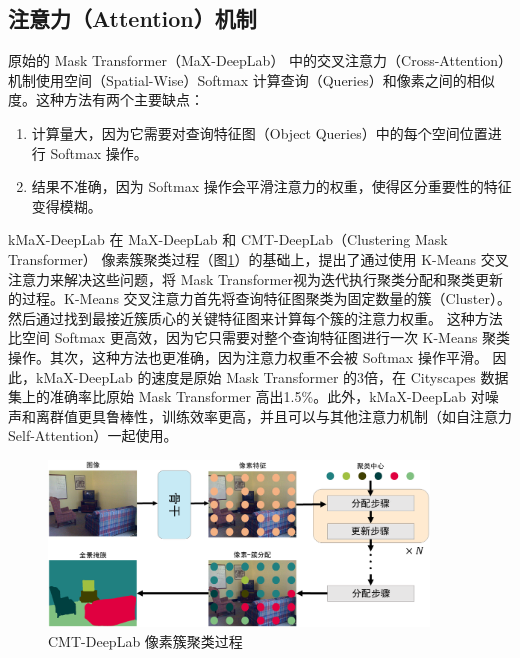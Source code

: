 \subsection{注意力（Attention）机制}

\par 原始的 Mask Transformer（MaX-DeepLab）\cite{mask_transformer} 中的交叉注意力（Cross-Attention）机制使用空间（Spatial-Wise）Softmax 计算查询（Queries）和像素之间的相似度。这种方法有两个主要缺点：

\begin{enumerate}
	\item 计算量大，因为它需要对查询特征图（Object Queries）中的每个空间位置进行 Softmax 操作。
	\item 结果不准确，因为 Softmax 操作会平滑注意力的权重，使得区分重要性的特征变得模糊。
\end{enumerate}

\par kMaX-DeepLab 在 MaX-DeepLab\cite{mask_transformer} 和 CMT-DeepLab（Clustering Mask Transformer）\cite{cluster_mask_transformer} 像素簇聚类过程（图\ref{fig:cluster_mask_transformer}）的基础上，提出了通过使用 K-Means 交叉注意力来解决这些问题，将 Mask Transformer\cite{mask_transformer}视为迭代执行聚类分配和聚类更新的过程。K-Means 交叉注意力首先将查询特征图聚类为固定数量的簇（Cluster）。然后通过找到最接近簇质心的关键特征图来计算每个簇的注意力权重。
这种方法比空间 Softmax 更高效，因为它只需要对整个查询特征图进行一次 K-Means 聚类操作。其次，这种方法也更准确，因为注意力权重不会被 Softmax 操作平滑。
因此，kMaX-DeepLab 的速度是原始 Mask Transformer 的3倍，在 Cityscapes 数据集上的准确率比原始 Mask Transformer 高出1.5\%。此外，kMaX-DeepLab 对噪声和离群值更具鲁棒性，训练效率更高，并且可以与其他注意力机制（如自注意力 Self-Attention）一起使用。

\begin{figure}[htb]
	\centering
	\includegraphics[width=0.9\textwidth]{figures/clustering_view_of_mask_transformer.png}
	\caption{CMT-DeepLab 像素簇聚类过程}
	\label{fig:cluster_mask_transformer}
\end{figure}

